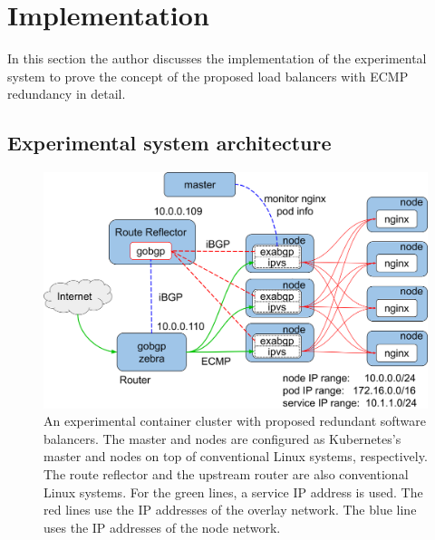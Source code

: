 \section{Implementation}

In this section the author discusses the implementation of the experimental system to prove the concept of the proposed load balancers with ECMP redundancy in detail.

\subsection{Experimental system architecture}\label{sec:poc}

\begin{figure}[h]
\centering
\includegraphics[width=0.9\columnwidth]{Figs/poc.png}

\par\bigskip
\centering
\begin{minipage}{0.9\columnwidth}
  \caption[Container cluster with proposed redundant software balancers]{
    An experimental container cluster with proposed redundant software balancers.
    The master and nodes are configured as Kubernetes's master and nodes on top of conventional Linux systems, respectively.
    The route reflector and the upstream router are also conventional Linux systems.
    For the green lines, a service IP address is used. The red lines use the IP addresses of the overlay network. The blue line uses the IP addresses of the node network.
  }
  \label{fig:poc}
\end{minipage}

\end{figure}

